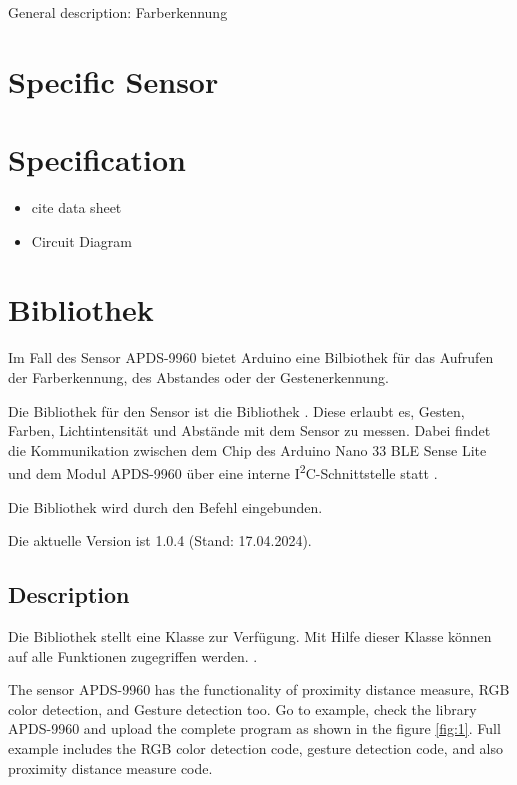 General description: Farberkennung


\section{Specific Sensor}


\section{Specification}

\begin{itemize}
    \item cite data sheet
    \item Circuit Diagram
\end{itemize}


\section{Bibliothek}

Im Fall des Sensor APDS-9960 bietet Arduino eine Bilbiothek  für das Aufrufen der Farberkennung, des Abstandes oder der Gestenerkennung.

Die Bibliothek für den Sensor ist  die  Bibliothek . Diese erlaubt es, Gesten, Farben, Lichtintensität und Abstände mit dem Sensor zu messen. Dabei findet die Kommunikation zwischen dem Chip des Arduino Nano 33 BLE Sense Lite und dem Modul APDS-9960  über eine interne I\textsuperscript{2}C-Schnittstelle statt \cite{Avago:2015}.

Die Bibliothek wird durch den Befehl  eingebunden.


Die aktuelle Version ist 1.0.4 (Stand: 17.04.2024).






\subsection{Description}

Die Bibliothek  stellt eine Klasse  zur Verfügung. Mit Hilfe dieser Klasse können auf alle Funktionen zugegriffen werden. \cite{Avago:2015}.

The sensor APDS-9960 has the functionality of proximity distance measure, RGB color detection, and Gesture detection too. Go to example, check the library APDS-9960 and upload the complete program as shown in the figure \ref{fig:1}. Full example includes the RGB color detection code, gesture detection code, and also proximity distance measure code.


